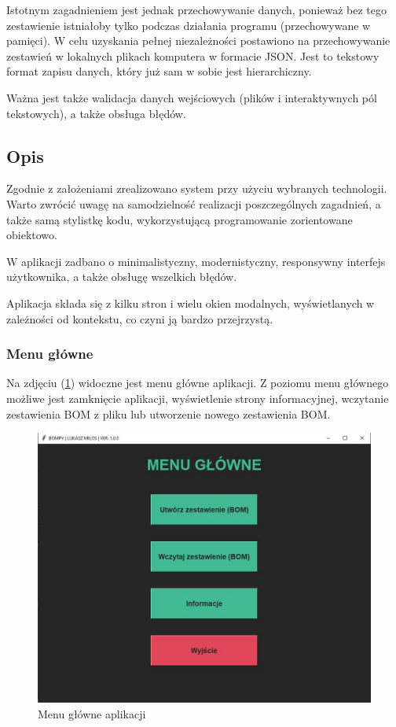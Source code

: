 \documentclass[12pt,twoside]{article}
\begin{document}
Istotnym zagadnieniem jest jednak przechowywanie danych, ponieważ bez tego zestawienie istniałoby tylko podczas działania programu (przechowywane w pamięci). W celu uzyskania pełnej niezależności postawiono na przechowywanie zestawień w lokalnych plikach komputera w formacie JSON. Jest to tekstowy format zapisu danych, który już sam w sobie jest hierarchiczny.

Ważna jest także walidacja danych wejściowych (plików i interaktywnych pól tekstowych), a także obsługa błędów.

\subsection*{Opis}
Zgodnie z założeniami zrealizowano system przy użyciu wybranych technologii. Warto zwrócić uwagę na samodzielność realizacji poszczególnych zagadnień, a także samą stylistkę kodu, wykorzystującą programowanie zorientowane obiektowo.

W aplikacji zadbano o minimalistyczny, modernistyczny, responsywny interfejs użytkownika, a także obsługę wszelkich błędów.

Aplikacja składa się z kilku stron i wielu okien modalnych, wyświetlanych w zależności od kontekstu, co czyni ją bardzo przejrzystą.

\subsubsection*{Menu główne}
Na zdjęciu (\ref{fig:app:menu}) widoczne jest menu główne aplikacji. Z poziomu menu głównego możliwe jest zamknięcie aplikacji, wyświetlenie strony informacyjnej, wczytanie zestawienia BOM z pliku lub utworzenie nowego zestawienia BOM.

\begin{figure}[h]
	\centering
	\includegraphics[width=\textwidth]{figures/app/menu.jpg}
	\caption{Menu główne aplikacji}
\label{fig:app:menu}
\end{figure}
\end{document}
